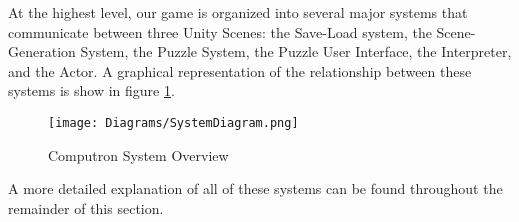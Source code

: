 At the highest level, our game is organized into several major systems that communicate between three Unity Scenes: the Save-Load system, the Scene-Generation System, the Puzzle System, the Puzzle User Interface, the Interpreter, and the Actor. A graphical representation of the relationship between these systems is show in figure \ref{fig:overall_system_diagram}.

\begin{figure}[!hb]
    \caption{Computron System Overview}
    \label{fig:overall_system_diagram}
    \centering
    \texttt{[image: Diagrams/SystemDiagram.png]}
\end{figure}

A more detailed explanation of all of these systems can be found throughout the remainder of this section.